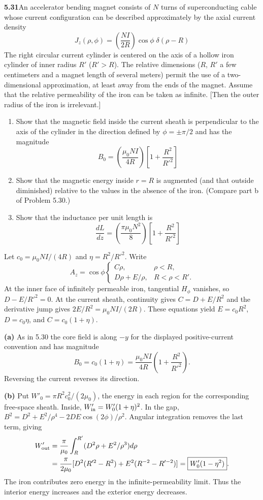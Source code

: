 \par\bigskip
\noindent\textbf{5.31}\quad An accelerator bending magnet consists of $N$ turns of superconducting cable whose current configuration can be described approximately by the axial current density
\[
J_{z}(\rho,\phi)=\left(\frac{NI}{2R}\right)\!\cos\phi\;\delta(\rho-R)
\]
The right circular current cylinder is centered on the axis of a hollow iron cylinder of inner radius $R'$ ($R'>R$). The relative dimensions ($R$, $R'$ a few centimeters and a magnet length of several meters) permit the use of a two-dimensional approximation, at least away from the ends of the magnet. Assume that the relative permeability of the iron can be taken as infinite. [Then the outer radius of the iron is irrelevant.]
\begin{enumerate}
\item[(a)] Show that the magnetic field inside the current sheath is perpendicular to the axis of the cylinder in the direction defined by $\phi=\pm\pi/2$ and has the magnitude
\[
B_{0}=\left(\frac{\mu_{0}NI}{4R}\right)\!\left[1+\frac{R^{2}}{R'^{2}}\right]
\]
\item[(b)] Show that the magnetic energy inside $r=R$ is augmented (and that outside diminished) relative to the values in the absence of the iron. (Compare part b of Problem 5.30.)
\item[(c)] Show that the inductance per unit length is
\[
\frac{dL}{dz}=\left(\frac{\pi\mu_{0}N^{2}}{8}\right)\!\left[1+\frac{R^{2}}{R'^{2}}\right]
\]
\end{enumerate}
\solution
Let $c_0=\mu_0NI/(4R)$ and $\eta=R^2/R'^2$.
Write
\[
A_z=\cos\phi\begin{cases}C\rho,&\rho<R,\\
D\rho+E/\rho,&R<\rho<R'.\end{cases}
\]
At the inner face of infinitely permeable iron, tangential $H_\phi$
vanishes, so $D-E/R'^2=0$.
At the current sheath, continuity gives $C=D+E/R^2$ and the derivative
jump gives $2E/R^2=\mu_0NI/(2R)$.
These equations yield
$E=c_0R^2$, $D=c_0\eta$, and $C=c_0(1+\eta)$.

\textbf{(a)} As in 5.30 the core field is along $-y$ for the displayed
positive-current convention and has magnitude
\[
\boxed{B_0=c_0(1+\eta)
=\frac{\mu_0NI}{4R}\left(1+\frac{R^2}{R'^2}\right).}
\]
Reversing the current reverses its direction.

\textbf{(b)} Put $W'_0=\pi R^2c_0^2/(2\mu_0)$, the energy in each
region for the corresponding free-space sheath.
Inside, $W'_{\rm in}=W'_0(1+\eta)^2$.
In the gap,
$B^2=D^2+E^2/\rho^4-2DE\cos(2\phi)/\rho^2$.
Angular integration removes the last term, giving
\[
\begin{split}
W'_{\rm out}
&=\frac{\pi}{\mu_0}\int_R^{R'}
(D^2\rho+E^2/\rho^3)d\rho\\
&=\frac{\pi}{2\mu_0}
[D^2(R'^2-R^2)+E^2(R^{-2}-R'^{-2})]
=\boxed{W'_0(1-\eta^2)}.
\end{split}
\]
The iron contributes zero energy in the infinite-permeability limit.
Thus the interior energy increases and the exterior energy decreases.

